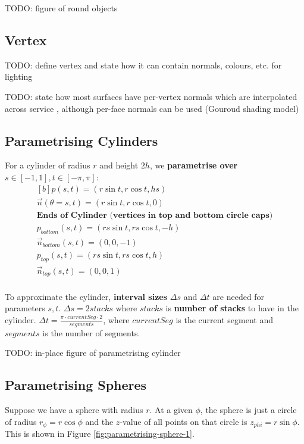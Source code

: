 \documentclass{article}
\begin{document}
TODO: figure of round objects

\subsection{Vertex}

TODO: define vertex and state how it can contain normals, colours, etc. for lighting

TODO: state how most surfaces have per-vertex normals which are interpolated  across service , although per-face normals can be used (Gouroud shading model)

\subsection{Parametrising Cylinders}

For a cylinder of radius $r$ and height $2h$, we \textbf{parametrise over} $s \in [-1, 1], t \in [-\pi, \pi]$:
\begin{equation}
	\begin{aligned}[b]
	p(s, t) = (r \sin t, r \cos t, hs) \\
	\vec{n}(\theta = s,t) = (r \sin t, r \cos t, 0)
	\\
	\textbf{Ends of Cylinder (vertices in top and bottom circle caps)} \\
	p_{bottom}(s, t) = (rs \sin t, rs \cos t, -h) \\
	\vec{n}_{bottom}(s, t) = (0, 0, -1) \\
	p_{top}(s, t) = (rs \sin t, rs \cos t, h) \\
	\vec{n}_{top}(s, t) = (0, 0, 1) \\
	\end{aligned}
	\label{eq:cylinder-parametrisation}
\end{equation}

To approximate the cylinder, \textbf{interval sizes} $\Delta s$ and $\Delta t$ are needed for parameters $s,t$. $\Delta s = 2stacks$ where $stacks$ is \textbf{number of stacks} to have in the cylinder. $\Delta t = \frac{\pi \cdot currentSeg \cdot 2}{segments}$, where $currentSeg$ is the current segment and $segments$ is the number of segments.

TODO: in-place figure of parametrising cylinder 

\subsection{Parametrising Spheres}

Suppose we have a sphere with radius $r$. At a given $\phi$, the sphere is just a circle of radius $r_{\phi} = r \cos \phi$ and the $z$-value of all points on that circle is $z_{phi} = r \sin \phi$. This is shown in Figure \ref{fig:parametrising-sphere-1}.
\end{document}
